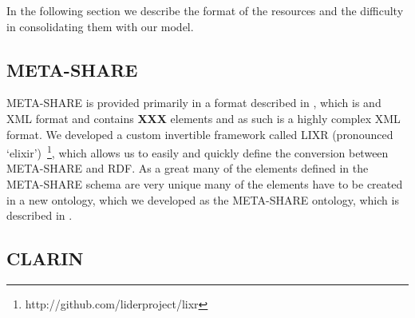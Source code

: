 \documentclass[smallextended]{svjour3}       %
\begin{document}
In the following section we describe the format of the resources and the
difficulty in consolidating them with our model.

\begin{table}
    \caption{\label{tab:resource-sizes}The sizes of the resources in terms of
    number of metadata records and total data size}
\end{table}

\subsection{META-SHARE}

META-SHARE is provided primarily in a format described in
\cite{gavrilidou2012meta}, which is
and XML format and contains \textbf{XXX} elements and as such is a highly complex XML
format. We developed a custom invertible framework called LIXR (pronounced
`elixir')~\footnote{http://github.com/liderproject/lixr}, which allows us to easily and
quickly define the conversion between META-SHARE and RDF. As a great many of the
elements defined in the META-SHARE schema are very unique many of the elements
have to be created in a new ontology, which we developed as the META-SHARE
ontology, which is described in \cite{todo}. 

\subsection{CLARIN}
\end{document}
